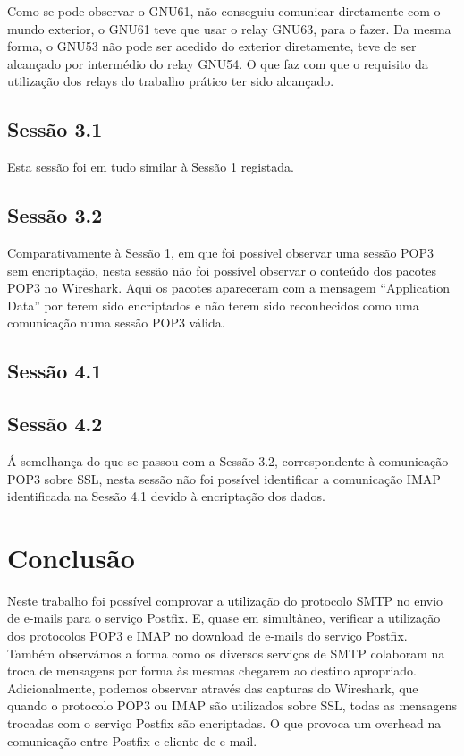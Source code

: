 \documentclass[a4paper,12pt]{article}
\begin{document}
Como se pode observar o GNU61, não conseguiu comunicar diretamente com o mundo 
exterior, o GNU61 teve que usar o relay GNU63, para o fazer. Da mesma forma, o
GNU53 não pode ser acedido do exterior diretamente, teve de ser alcançado
por intermédio do relay GNU54. O que faz com que o requisito da utilização
dos relays do trabalho prático ter sido alcançado.

\subsection{Sessão 3.1}

Esta sessão foi em tudo similar à Sessão 1 registada.

\subsection{Sessão 3.2}

Comparativamente à Sessão 1, em que foi possível observar uma sessão POP3 sem
encriptação, nesta sessão não foi possível observar o conteúdo dos pacotes POP3
no Wireshark. Aqui os pacotes apareceram com a mensagem ``Application
Data'' por terem sido encriptados e não terem sido reconhecidos como
uma comunicação numa sessão POP3 válida.

\subsection{Sessão 4.1}



\subsection{Sessão 4.2}

Á semelhança do que se passou com a Sessão 3.2, correspondente à comunicação
POP3 sobre SSL, nesta sessão não foi possível identificar a comunicação IMAP
identificada na Sessão 4.1 devido à encriptação dos dados.

\section{Conclusão}

Neste trabalho foi possível comprovar a utilização do protocolo SMTP no 
envio de e-mails para o serviço Postfix. E, quase em simultâneo, verificar 
a utilização dos protocolos POP3 e IMAP no download de e-mails do 
serviço Postfix.
Também observámos a forma como os diversos serviços de SMTP colaboram na
troca de mensagens por forma às mesmas chegarem ao destino apropriado.
Adicionalmente, podemos observar através das capturas do Wireshark, que
quando o protocolo POP3 ou IMAP são utilizados sobre SSL, todas as
mensagens trocadas com o serviço Postfix são encriptadas. O que provoca
um overhead na comunicação entre Postfix e cliente de e-mail.
\end{document}

